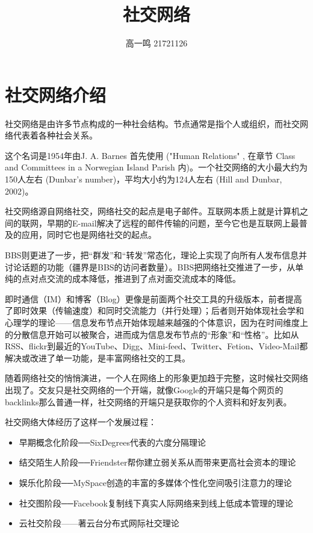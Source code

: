 \documentclass[12pt]{report}
\title{社交网络}
\author{高一鸣 21721126}
\date{}
\begin{document}
		
	\maketitle
		
	\tableofcontents
	
	\renewcommand\thesection{\arabic {section}}
		
	\section{社交网络介绍}
	
		社交网络是由许多节点构成的一种社会结构。节点通常是指个人或组织，而社交网络代表着各种社会关系。
			
		这个名词是1954年由J. A. Barnes 首先使用 ("Human Relations" , 在章节 Class and Committees in a Norwegian Island Parish 内)。一个社交网络的大小最大约为150人左右 (Dunbar's number)，平均大小约为124人左右 (Hill and Dunbar, 2002)。
		
		社交网络源自网络社交，网络社交的起点是电子邮件。互联网本质上就是计算机之间的联网，早期的E-mail解决了远程的邮件传输的问题，至今它也是互联网上最普及的应用，同时它也是网络社交的起点。
		
		BBS则更进了一步，把“群发”和“转发”常态化，理论上实现了向所有人发布信息并讨论话题的功能（疆界是BBS的访问者数量）。BBS把网络社交推进了一步，从单纯的点对点交流的成本降低，推进到了点对面交流成本的降低。
		
		即时通信（IM）和博客（Blog）更像是前面两个社交工具的升级版本，前者提高了即时效果（传输速度）和同时交流能力（并行处理）；后者则开始体现社会学和心理学的理论——信息发布节点开始体现越来越强的个体意识，因为在时间维度上的分散信息开始可以被聚合，进而成为信息发布节点的“形象”和“性格”。比如从RSS、flickr到最近的YouTube、Digg、Mini-feed、Twitter、Fetion、Video-Mail都解决或改进了单一功能，是丰富网络社交的工具。
		
		随着网络社交的悄悄演进，一个人在网络上的形象更加趋于完整，这时候社交网络出现了。交友只是社交网络的一个开端，就像Google的开端只是每个网页的backlinks那么普通一样，社交网络的开端只是获取你的个人资料和好友列表。
		
		社交网络大体经历了这样一个发展过程：
		\begin{itemize}
			\item 早期概念化阶段──SixDegrees代表的六度分隔理论
			\item 结交陌生人阶段──Friendster帮你建立弱关系从而带来更高社会资本的理论
			\item 娱乐化阶段──MySpace创造的丰富的多媒体个性化空间吸引注意力的理论
			\item 社交图阶段──Facebook复制线下真实人际网络来到线上低成本管理的理论
			\item 云社交阶段——著云台分布式网际社交理论
		\end{itemize}
		
\end{document}
